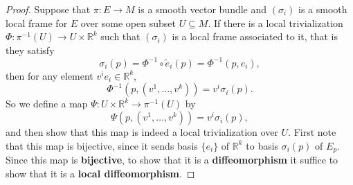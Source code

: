 \documentclass[a4paper]{article}
\theoremstyle{remark}
\newcommand{\rk}{\mathbb{R}^k} %
\newcommand{\subhim}{\subseteq} %
\begin{document}
\begin{proof}
Suppose that $\pi :E \to M$ is a smooth vector bundle and $(\sigma_i)$ is a smooth local frame for $E$ over some open subset $U \subhim M$. If there is a local trivialization $\Phi : \pi^{-1}(U) \to U \times \rk$ such that $(\sigma_i)$ is a local frame associated to it, that is they satisfy
$$
\sigma_i(p) = \Phi^{-1} \circ \widetilde{e}_i(p) = \Phi^{-1}(p,e_i),
$$
then for any element $v^ie_i \in \rk$,
$$
\Phi^{-1} (p,(v^1,\dots,v^k)) = v^i\sigma_i(p).
$$
So we define a map $\Psi : U \times \rk \to \pi^{-1}(U)$ by
$$
\Psi (p,(v^1,\dots,v^k)) = v^i \sigma_i(p),
$$
and then show that this map is indeed a local trivialization over $U$. First note that this map is bijective, since it sends basis $\{e_i\}$ of $\rk$ to basis $\sigma_i(p)$ of $E_p$. Since this map is \textbf{bijective}, to show that it is a \textbf{diffeomorphism} it suffice to show that it is a \textbf{local diffeomorphism}.   


\end{proof}
\end{document}
